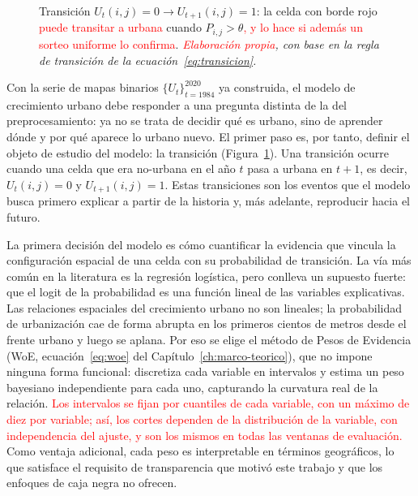 \begin{figure}[htbp]
{}
  \caption{Transición $U_t(i,j)=0 \to U_{t+1}(i,j)=1$: la celda con borde rojo \textcolor{red}{puede transitar a urbana} cuando $P_{i,j}>\theta$\textcolor{red}{, y lo hace si además un sorteo uniforme lo confirma}. \textit{\textcolor{red}{Elaboración propia}, con base en la regla de transición de la ecuación~\textcolor{red}{\ref{eq:transicion}}.}}
  \label{fig:transicion}
\end{figure}

Con la serie de mapas binarios $\{U_t\}_{t=1984}^{2020}$ ya construida, el modelo de crecimiento urbano debe responder a una pregunta distinta de la del preprocesamiento: ya no se trata de decidir qué es urbano, sino de aprender dónde y por qué aparece lo urbano nuevo. El primer paso es, por tanto, definir el objeto de estudio del modelo: la transición (Figura~\ref{fig:transicion}). Una transición ocurre cuando una celda que era no-urbana en el año $t$ pasa a urbana en $t+1$, es decir, $U_t(i,j)=0$ y $U_{t+1}(i,j)=1$. Estas transiciones son los eventos que el modelo busca primero explicar a partir de la historia y, más adelante, reproducir hacia el futuro.

La primera decisión del modelo es cómo cuantificar la evidencia que vincula la configuración espacial de una celda con su probabilidad de transición. La vía más común en la literatura es la regresión logística, pero conlleva un supuesto fuerte: que el logit de la probabilidad es una función lineal de las variables explicativas. Las relaciones espaciales del crecimiento urbano no son lineales; la probabilidad de urbanización cae de forma abrupta en los primeros cientos de metros desde el frente urbano y luego se aplana. Por eso se elige el método de Pesos de Evidencia (WoE, ecuación~\ref{eq:woe} del Capítulo~\ref{ch:marco-teorico}), que no impone ninguna forma funcional: discretiza cada variable en intervalos y estima un peso bayesiano independiente para cada uno, capturando la curvatura real de la relación. \textcolor{red}{Los intervalos se fijan por cuantiles de cada variable, con un máximo de diez por variable; así, los cortes dependen de la distribución de la variable, con independencia del ajuste, y son los mismos en todas las ventanas de evaluación.} Como ventaja adicional, cada peso es interpretable en términos geográficos, lo que satisface el requisito de transparencia que motivó este trabajo y que los enfoques de caja negra no ofrecen.

